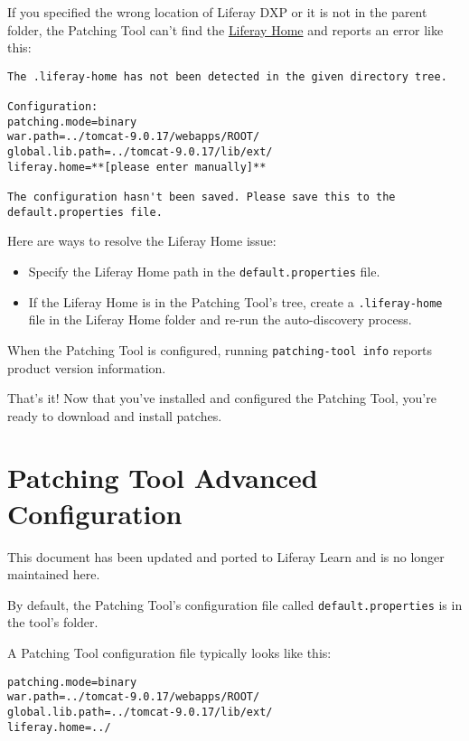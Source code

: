 If you specified the wrong location of Liferay DXP or it is not in the
parent folder, the Patching Tool can't find the
\href{/docs/7-2/deploy/-/knowledge_base/d/liferay-home}{Liferay Home}
and reports an error like this:

\begin{verbatim}
The .liferay-home has not been detected in the given directory tree.

Configuration:
patching.mode=binary
war.path=../tomcat-9.0.17/webapps/ROOT/
global.lib.path=../tomcat-9.0.17/lib/ext/
liferay.home=**[please enter manually]**

The configuration hasn't been saved. Please save this to the default.properties file.
\end{verbatim}

Here are ways to resolve the Liferay Home issue:

\begin{itemize}
\tightlist
\item
  Specify the Liferay Home path in the \texttt{default.properties} file.
\item
  If the Liferay Home is in the Patching Tool's tree, create a
  \texttt{.liferay-home} file in the Liferay Home folder and re-run the
  auto-discovery process.
\end{itemize}

When the Patching Tool is configured, running
\texttt{patching-tool\ info} reports product version information.

That's it! Now that you've installed and configured the Patching Tool,
you're ready to download and install patches.

\chapter{Patching Tool Advanced
Configuration}\label{patching-tool-advanced-configuration}

{This document has been updated and ported to Liferay Learn and is no
longer maintained here.}

By default, the Patching Tool's configuration file called
\texttt{default.properties} is in the tool's folder.

A Patching Tool configuration file typically looks like this:

\begin{verbatim}
patching.mode=binary
war.path=../tomcat-9.0.17/webapps/ROOT/
global.lib.path=../tomcat-9.0.17/lib/ext/
liferay.home=../
\end{verbatim}

